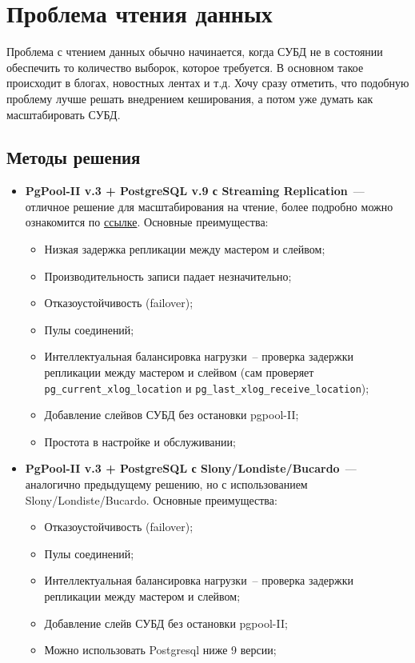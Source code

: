 \section{Проблема чтения данных}

Проблема с чтением данных обычно начинается, когда СУБД не в состоянии обеспечить то количество выборок, которое требуется. В основном такое происходит в блогах, новостных лентах и т.д. Хочу сразу отметить, что подобную проблему лучше решать внедрением кеширования, а потом уже думать как масштабировать СУБД.

\subsection{Методы решения}

\begin{itemize}
  \item \textbf{PgPool-II v.3 + PostgreSQL v.9 с Streaming Replication}~--- отличное решение для масштабирования на чтение, более подробно можно ознакомится по \href{http://pgpool.projects.pgfoundry.org/contrib\_docs/simple\_sr\_setting/index.html}{ссылке}. Основные преимущества:

  \begin{itemize}
    \item Низкая задержка репликации между мастером и слейвом;
    \item Производительность записи падает незначительно;
    \item Отказоустойчивость (failover);
    \item Пулы соединений;
    \item Интеллектуальная балансировка нагрузки~-- проверка задержки репликации между мастером и слейвом (сам проверяет \lstinline!pg_current_xlog_location! и \lstinline!pg_last_xlog_receive_location!);
    \item Добавление слейвов СУБД без остановки pgpool-II;
    \item Простота в настройке и обслуживании;
  \end{itemize}

  \item \textbf{PgPool-II v.3 + PostgreSQL с Slony/Londiste/Bucardo}~--- аналогично предыдущему решению, но с использованием Slony/Londiste/Bucardo. Основные преимущества:

  \begin{itemize}
    \item Отказоустойчивость (failover);
    \item Пулы соединений;
    \item Интеллектуальная балансировка нагрузки~-- проверка задержки репликации между мастером и слейвом;
    \item Добавление слейв СУБД без остановки pgpool-II;
    \item Можно использовать Postgresql ниже 9 версии;
  \end{itemize}


\end{itemize}
